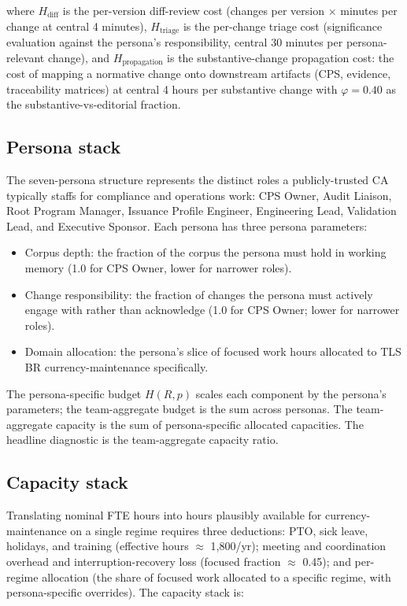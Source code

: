 \documentclass[11pt,letterpaper]{article}
\begin{document}
where $H_{\text{diff}}$ is the per-version diff-review cost (changes per version $\times$ minutes per change at central 4 minutes), $H_{\text{triage}}$ is the per-change triage cost (significance evaluation against the persona's responsibility, central 30 minutes per persona-relevant change), and $H_{\text{propagation}}$ is the substantive-change propagation cost: the cost of mapping a normative change onto downstream artifacts (CPS, evidence, traceability matrices) at central 4 hours per substantive change with $\varphi = 0.40$ as the substantive-vs-editorial fraction.

\subsection{Persona stack}
\label{sec:persona}

The seven-persona structure represents the distinct roles a publicly-trusted CA typically staffs for compliance and operations work: CPS Owner, Audit Liaison, Root Program Manager, Issuance Profile Engineer, Engineering Lead, Validation Lead, and Executive Sponsor. Each persona has three persona parameters:

\begin{itemize}
\item Corpus depth: the fraction of the corpus the persona must hold in working memory (1.0 for CPS Owner, lower for narrower roles).
\item Change responsibility: the fraction of changes the persona must actively engage with rather than acknowledge (1.0 for CPS Owner; lower for narrower roles).
\item Domain allocation: the persona's slice of focused work hours allocated to TLS BR currency-maintenance specifically.
\end{itemize}

The persona-specific budget $H(R, p)$ scales each component by the persona's parameters; the team-aggregate budget is the sum across personas. The team-aggregate capacity is the sum of persona-specific allocated capacities. The headline diagnostic is the team-aggregate capacity ratio.

\subsection{Capacity stack}
\label{sec:capacity}

Translating nominal FTE hours into hours plausibly available for currency-maintenance on a single regime requires three deductions: PTO, sick leave, holidays, and training (effective hours $\approx$ 1{,}800/yr); meeting and coordination overhead and interruption-recovery loss (focused fraction $\approx$ 0.45); and per-regime allocation (the share of focused work allocated to a specific regime, with persona-specific overrides). The capacity stack is:
\end{document}
